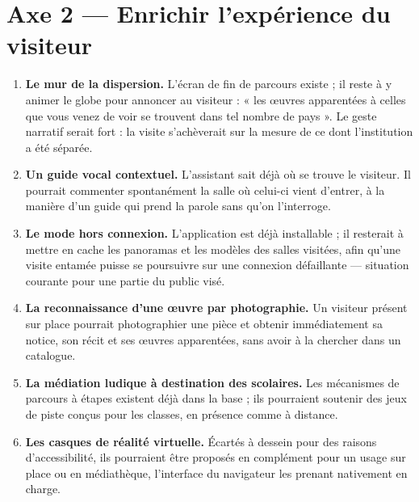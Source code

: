 \section*{Axe 2 — Enrichir l'expérience du visiteur}

\begin{enumerate}
  \item \textbf{Le mur de la dispersion.} L'écran de fin de parcours existe ;
        il reste à y animer le globe pour annoncer au visiteur : « les œuvres
        apparentées à celles que vous venez de voir se trouvent dans tel nombre
        de pays ». Le geste narratif serait fort : la visite s'achèverait sur la
        mesure de ce dont l'institution a été séparée.

  \item \textbf{Un guide vocal contextuel.} L'assistant sait déjà où se trouve
        le visiteur. Il pourrait commenter spontanément la salle où celui-ci
        vient d'entrer, à la manière d'un guide qui prend la parole sans qu'on
        l'interroge.

  \item \textbf{Le mode hors connexion.} L'application est déjà installable ; il
        resterait à mettre en cache les panoramas et les modèles des salles
        visitées, afin qu'une visite entamée puisse se poursuivre sur une
        connexion défaillante — situation courante pour une partie du public
        visé.

  \item \textbf{La reconnaissance d'une œuvre par photographie.} Un visiteur
        présent sur place pourrait photographier une pièce et obtenir
        immédiatement sa notice, son récit et ses œuvres apparentées, sans avoir
        à la chercher dans un catalogue.

  \item \textbf{La médiation ludique à destination des scolaires.} Les
        mécanismes de parcours à étapes existent déjà dans la base ; ils
        pourraient soutenir des jeux de piste conçus pour les classes, en
        présence comme à distance.

  \item \textbf{Les casques de réalité virtuelle.} Écartés à dessein pour des
        raisons d'accessibilité, ils pourraient être proposés en complément
        pour un usage sur place ou en médiathèque, l'interface du navigateur les
        prenant nativement en charge.
\end{enumerate}

